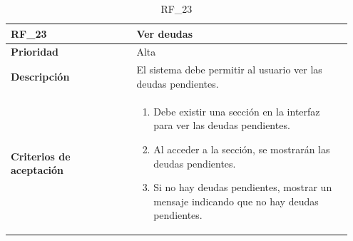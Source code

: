 \begin{table}[htb!]
    \begin{tabular}{|p{0.35\linewidth}|p{0.6\linewidth}|}
        \hline
        \rowcolor[HTML]{C0C0C0}  
        \textbf{RF\_23} & \textbf{Ver deudas} \\
        \hline
        \textbf{Prioridad} & Alta \\
        \hline
        \textbf{Descripción} & El sistema debe permitir al usuario ver las deudas pendientes.  \\
        \hline
        \vspace{0.5mm}
        \textbf{Criterios de aceptación} & 
        \begin{minipage}[t]{0.9\linewidth}
            \begin{enumerate}
                \item Debe existir una sección en la interfaz para ver las deudas pendientes.
                \item Al acceder a la sección, se mostrarán las deudas pendientes.
                \item Si no hay deudas pendientes, mostrar un mensaje indicando que no hay deudas pendientes.
            \end{enumerate}
            \vspace{2mm}
        \end{minipage} \\
        \hline
    \end{tabular}
    \caption{RF\_23}
    \label{req:RF23}
\end{table}

